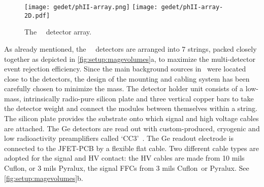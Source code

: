 \begin{figure}
  \centering
  \texttt{[image: gedet/phII-array.png]}
  \hspace{0.5cm}
  \texttt{[image: gedet/phII-array-2D.pdf]}
  \caption{%
    The \gerda\ \phasetwo\ detector array.
  }\label{fig:setup:array}
\end{figure}

As already mentioned, the \gerda\ \phasetwo\ detectors are arranged into 7 strings, packed
closely together as depicted in \cref{fig:setup:magevolumes}a, to maximize the
multi-detector event rejection efficiency. Since the main background sources in
\phaseone\ were located close to the detectors, the design of the mounting and cabling
system has been carefully chosen to minimize the mass. The detector holder unit consists
of a low-mass, intrinsically radio-pure silicon plate and three vertical copper bars to
take the detector weight and connect the modules between themselves within a string. The
silicon plate provides the substrate onto which signal and high voltage cables are
attached. The Ge detectors are read out with custom-produced, cryogenic and low
radioactivity preamplifiers called `CC3'~\cite{Riboldi2015}. The Ge readout electrode is
connected to the JFET-PCB by a flexible flat cable. Two different cable types are adopted
for the signal and HV contact: the HV cables are made from 10 mils Cuflon\reg, or 3 mils
Pyralux\reg, the signal FFCs from 3 mils Cuflon\reg\ or Pyralux\reg. See
\cref{fig:setup:magevolumes}b.

